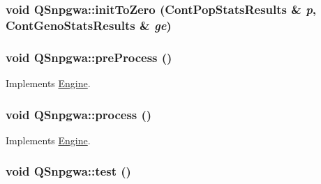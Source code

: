 \hypertarget{classQSnpgwa_a882fa04dd74b9772bbd452d5acc0dfb8}{
\subsubsection[{initToZero}]{\setlength{\rightskip}{0pt plus 5cm}void QSnpgwa::initToZero ({\bf ContPopStatsResults} \& {\em p}, \/  {\bf ContGenoStatsResults} \& {\em ge})}}
\label{classQSnpgwa_a882fa04dd74b9772bbd452d5acc0dfb8}
\hypertarget{classQSnpgwa_acc9e7d7e48d9c3e2fbb0a75e263f0c50}{
\subsubsection[{preProcess}]{\setlength{\rightskip}{0pt plus 5cm}void QSnpgwa::preProcess ()}}
\label{classQSnpgwa_acc9e7d7e48d9c3e2fbb0a75e263f0c50}


Implements \hyperlink{classEngine_aec7076b8979a13c96eceb362437dc68c}{Engine}.

\hypertarget{classQSnpgwa_a4873c7584d427c41a01e1bba159cf486}{
\subsubsection[{process}]{\setlength{\rightskip}{0pt plus 5cm}void QSnpgwa::process ()}}
\label{classQSnpgwa_a4873c7584d427c41a01e1bba159cf486}


Implements \hyperlink{classEngine_a005f8e277c3dea16ea05803fba223db7}{Engine}.

\hypertarget{classQSnpgwa_aa127cdd0a042058f1ecab33d831a58a6}{
\subsubsection[{test}]{\setlength{\rightskip}{0pt plus 5cm}void QSnpgwa::test ()}}
\label{classQSnpgwa_aa127cdd0a042058f1ecab33d831a58a6}


